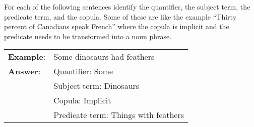 

\practiceproblems
\problempart For each of the following sentences identify the quantifier, the subject term, the predicate term, and the copula. Some of these are like the example ``Thirty percent of Canadians speak French'' where the copula is implicit and the predicate needs to be transformed into a noun phrase.

\begin{longtabu}{p{.1\linewidth}p{.9\linewidth}}
\textbf{Example}: & Some dinosaurs had feathers\\
\textbf{Answer}: & Quantifier: Some \\
&Subject term: Dinosaurs \\
&Copula: Implicit \\
& Predicate term: Things with feathers \\
\end{longtabu}

